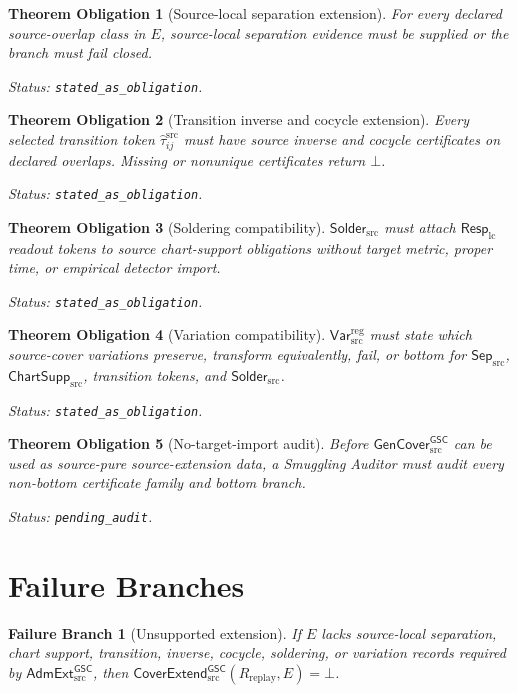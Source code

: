 \documentclass[11pt]{article}
\newcommand{\RespLC}{\mathsf{Resp}_{\mathrm{lc}}}
\newcommand{\GenCover}{\mathsf{GenCover}_{\mathrm{src}}^{\mathsf{GSC}}}
\newcommand{\AdmExt}{\mathsf{AdmExt}_{\mathrm{src}}^{\mathsf{GSC}}}
\newcommand{\CoverExt}{\mathsf{CoverExtend}_{\mathrm{src}}^{\mathsf{GSC}}}
\newcommand{\SepSrc}{\mathsf{Sep}_{\mathrm{src}}}
\newcommand{\ChartSuppSrc}{\mathsf{ChartSupp}_{\mathrm{src}}}
\newcommand{\SolderSrc}{\mathsf{Solder}_{\mathrm{src}}}
\newcommand{\VarRegSrc}{\mathsf{Var}^{\mathrm{reg}}_{\mathrm{src}}}
\newcommand{\Tau}{\widehat{\tau}^{\mathrm{src}}}
\newcommand{\Bot}{\bot}
\newtheorem{obligation}{Theorem Obligation}
\newtheorem{branch}{Failure Branch}
\begin{document}
\begin{obligation}[Source-local separation extension]
For every declared source-overlap class in \(E\), source-local separation
evidence must be supplied or the branch must fail closed.

Status: \texttt{stated\_as\_obligation}.
\end{obligation}

\begin{obligation}[Transition inverse and cocycle extension]
Every selected transition token \(\Tau_{ij}\) must have source inverse and
cocycle certificates on declared overlaps. Missing or nonunique certificates
return \(\Bot\).

Status: \texttt{stated\_as\_obligation}.
\end{obligation}

\begin{obligation}[Soldering compatibility]
\(\SolderSrc\) must attach \(\RespLC\) readout tokens to source chart-support
obligations without target metric, proper time, or empirical detector import.

Status: \texttt{stated\_as\_obligation}.
\end{obligation}

\begin{obligation}[Variation compatibility]
\(\VarRegSrc\) must state which source-cover variations preserve, transform
equivalently, fail, or bottom for \(\SepSrc\), \(\ChartSuppSrc\), transition
tokens, and \(\SolderSrc\).

Status: \texttt{stated\_as\_obligation}.
\end{obligation}

\begin{obligation}[No-target-import audit]
Before \(\GenCover\) can be used as source-pure source-extension data, a
Smuggling Auditor must audit every non-bottom certificate family and bottom
branch.

Status: \texttt{pending\_audit}.
\end{obligation}

\section{Failure Branches}

\begin{branch}[Unsupported extension]
If \(E\) lacks source-local separation, chart support, transition, inverse,
cocycle, soldering, or variation records required by \(\AdmExt\), then
\(\CoverExt(R_{\mathrm{replay}},E)=\Bot\).
\end{branch}
\end{document}
